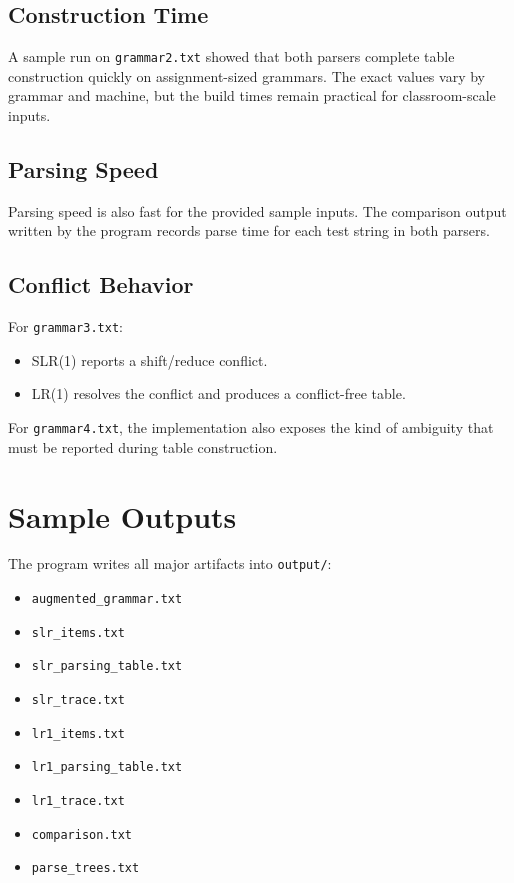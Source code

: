 \documentclass[12pt]{article}
\begin{document}
\subsection{Construction Time}
A sample run on \texttt{grammar2.txt} showed that both parsers complete table construction quickly on assignment-sized grammars. The exact values vary by grammar and machine, but the build times remain practical for classroom-scale inputs.

\subsection{Parsing Speed}
Parsing speed is also fast for the provided sample inputs. The comparison output written by the program records parse time for each test string in both parsers.

\subsection{Conflict Behavior}
For \texttt{grammar3.txt}:
\begin{itemize}[leftmargin=1.5em]
    \item SLR(1) reports a shift/reduce conflict.
    \item LR(1) resolves the conflict and produces a conflict-free table.
\end{itemize}

For \texttt{grammar4.txt}, the implementation also exposes the kind of ambiguity that must be reported during table construction.

\section{Sample Outputs}

The program writes all major artifacts into \texttt{output/}:
\begin{itemize}[leftmargin=1.5em]
    \item \texttt{augmented\_grammar.txt}
    \item \texttt{slr_items.txt}
    \item \texttt{slr_parsing_table.txt}
    \item \texttt{slr_trace.txt}
    \item \texttt{lr1_items.txt}
    \item \texttt{lr1_parsing_table.txt}
    \item \texttt{lr1_trace.txt}
    \item \texttt{comparison.txt}
    \item \texttt{parse_trees.txt}
\end{itemize}
\end{document}
